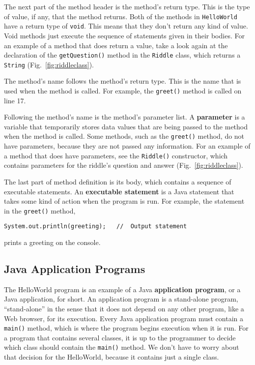 The next part of the method header is the method's return type. This
is the type of value, if any, that the method returns.  Both of the
methods in {\tt HelloWorld} have a return type of {\tt void}. This
means that they don't return any kind of value. Void methods just
execute the sequence of statements given in their bodies.  For an
example of a method that does return a value, take a look again at the
declaration of the {\tt getQuestion()} method in the {\tt Riddle}
class, which returns a {\tt String} (Fig.~\ref{fig:riddleclass}).

The method's name follows the method's return type. This is the name
that is used when the method is called. For example, the {\tt greet()}
method is called on line 17.

Following the method's name is the method's parameter list. A {\bf
parameter} is a variable that temporarily stores data values that are
being passed to the method when the method is called. Some methods,
such as the {\tt greet()} method, do not have parameters, because they
are not passed any information. For an example of a method that does
have parameters, see the {\tt Riddle()} constructor, which contains
parameters for the riddle's question and answer
(Fig.~\ref{fig:riddleclass}).  

The last part of method definition is its body, which contains a
sequence of executable statements. An {\bf executable statement} is a
Java statement that takes some kind of action when the program is run.
For example, the statement in the {\tt greet()} method,

\begin{jjjlisting}
\begin{lstlisting}
System.out.println(greeting);   //  Output statement
\end{lstlisting}
\end{jjjlisting}

\noindent prints a greeting on the console. 

\subsection{Java Application Programs}

The HelloWorld program is an example of a Java {\bf application
program}, or a Java application, for short.  An application program is
a stand-alone program, ``stand-alone'' in the sense that it does not
depend on any other program, like a Web browser, for its execution.
Every Java application program must contain a {\tt main()} method,
which is where the program begins execution when it is run. For a
program that contains several classes, it is up to the programmer to
decide which class should contain the {\tt main()} method. We don't
have to worry about that decision for the HelloWorld, because it
contains just a single class.

